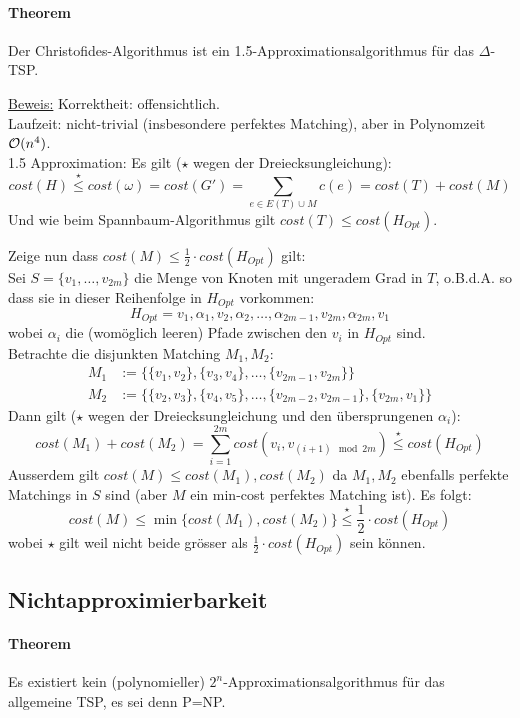 \paragraph{Theorem}
Der Christofides-Algorithmus ist ein 1.5-Approximationsalgorithmus für das $\Delta$-TSP.

\underline{Beweis:}
Korrektheit: offensichtlich. \\
Laufzeit: nicht-trivial (insbesondere perfektes Matching), aber in Polynomzeit $\mathcal{O}(n^4)$. \\
1.5 Approximation:
Es gilt ($\star$ wegen der Dreiecksungleichung):
$$ cost(H) \overset{\star}{\leq} cost(\omega) = cost(G') = \sum_{e \in E(T) \cup M} c(e) = cost(T) + cost(M) $$
Und wie beim Spannbaum-Algorithmus gilt $cost(T) \leq cost(H_{Opt})$.

Zeige nun dass $cost(M) \leq \frac{1}{2} \cdot cost(H_{Opt})$ gilt:
\\
Sei $S=\{ v_1, \dots , v_{2m} \}$ die Menge von Knoten mit ungeradem Grad in $T$, o.B.d.A. so dass sie
in dieser Reihenfolge in $H_{Opt}$ vorkommen:
$$ H_{Opt} = v_1, \alpha_1, v_2, \alpha_2, \dots, \alpha_{2m-1}, v_{2m}, \alpha_{2m}, v_1 $$
wobei $\alpha_i$ die (womöglich leeren) Pfade zwischen den $v_i$ in $H_{Opt}$ sind.
\\
Betrachte die disjunkten Matching $M_1, M_2$:
\begin{align*}
M_1 & := \{ \{v_1,v_2\}, \{v_3,v_4\}, \dots, \{v_{2m-1},v_{2m}\} \} \\
M_2 & := \{ \{v_2,v_3\}, \{v_4,v_5\}, \dots, \{v_{2m-2},v_{2m-1}\}, \{v_{2m},v_1\} \}
\end{align*}
Dann gilt ($\star$ wegen der Dreiecksungleichung und den übersprungenen $\alpha_i$):
$$ cost(M_1) + cost(M_2) = \sum_{i=1}^{2m} cost(v_i, v_{(i+1) \mod 2m}) \overset{\star}{\leq} cost(H_{Opt}) $$
Ausserdem gilt $cost(M) \leq cost(M_1), cost(M_2)$ da $M_1, M_2$ ebenfalls perfekte Matchings in $S$ sind
(aber $M$ ein min-cost perfektes Matching ist).
Es folgt:
$$ cost(M) \leq \min \{ cost(M_1), cost(M_2) \} \overset{\star}{\leq} \frac{1}{2} \cdot cost(H_{Opt}) $$
wobei $\star$ gilt weil nicht beide grösser als  $\frac{1}{2} \cdot cost(H_{Opt})$ sein können.


\subsection{Nichtapproximierbarkeit}

\paragraph{Theorem}
Es existiert kein (polynomieller) $2^n$-Approximationsalgorithmus für das allgemeine TSP, es sei denn P=NP.

